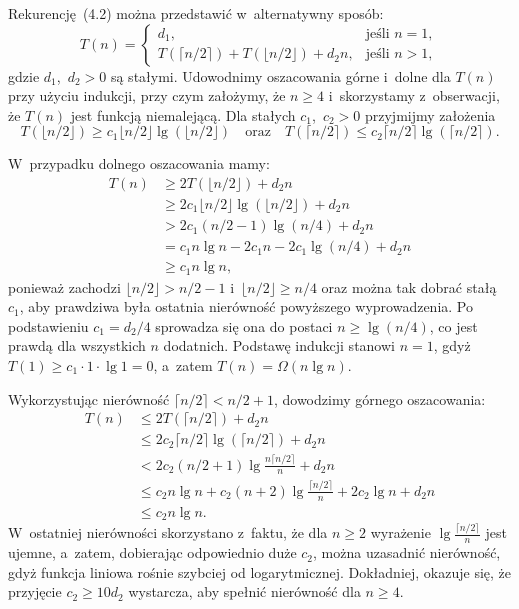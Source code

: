 \exercise %
Rekurencję~(4.2) można przedstawić w~alternatywny sposób:
\[
	T(n) =
	\begin{cases}
		d_1, & \text{jeśli $n=1$}, \\
		T(\lceil n/2\rceil)+T(\lfloor n/2\rfloor)+d_2n, & \text{jeśli $n>1$},
	\end{cases}
\]
gdzie $d_1$,~$d_2>0$ są stałymi. Udowodnimy oszacowania górne i~dolne dla $T(n)$ przy użyciu indukcji, przy czym założymy, że $n\ge4$ i~skorzystamy z~obserwacji, że $T(n)$ jest funkcją niemalejącą. Dla stałych $c_1$,~$c_2>0$ przyjmijmy założenia
\[
	T(\lfloor n/2\rfloor) \ge c_1\lfloor n/2\rfloor\lg(\lfloor n/2\rfloor) \quad\text{oraz}\quad T(\lceil n/2\rceil) \le c_2\lceil n/2\rceil\lg(\lceil n/2\rceil).
\]

W~przypadku dolnego oszacowania mamy:
\begin{align*}
	T(n) &\ge 2T(\lfloor n/2\rfloor)+d_2n \\
	&\ge 2c_1\lfloor n/2\rfloor\lg(\lfloor n/2\rfloor)+d_2n \\
	&> 2c_1(n/2-1)\lg(n/4)+d_2n \\
	&= c_1n\lg n-2c_1n-2c_1\!\lg(n/4)+d_2n \\
	&\ge c_1n\lg n,
\end{align*}
ponieważ zachodzi $\lfloor n/2\rfloor>n/2-1$ i~$\lfloor n/2\rfloor\ge n/4$ oraz można tak dobrać stałą $c_1$, aby prawdziwa była ostatnia nierówność powyższego wyprowadzenia. Po podstawieniu $c_1=d_2/4$ sprowadza się ona do postaci $n\ge\lg(n/4)$, co jest prawdą dla wszystkich $n$ dodatnich. Podstawę indukcji stanowi $n=1$, gdyż $T(1)\ge c_1\cdot 1\cdot\lg1=0$, a~zatem $T(n)=\Omega(n\lg n)$.

Wykorzystując nierówność $\lceil n/2\rceil<n/2+1$, dowodzimy górnego oszacowania:
\begin{align*}
	T(n) &\le 2T(\lceil n/2\rceil)+d_2n \\
	&\le 2c_2\lceil n/2\rceil\lg(\lceil n/2\rceil)+d_2n \\
	&< 2c_2(n/2+1)\lg\frac{n\lceil n/2\rceil}{n}+d_2n \\
	&\le c_2n\lg n+c_2(n+2)\lg\frac{\lceil n/2\rceil}{n}+2c_2\lg n+d_2n \\
	&\le c_2n\lg n.
\end{align*}
W~ostatniej nierówności skorzystano z~faktu, że dla $n\ge2$ wyrażenie $\lg\frac{\lceil n/2\rceil}{n}$ jest ujemne, a~zatem, dobierając odpowiednio duże $c_2$, można uzasadnić nierówność, gdyż funkcja liniowa rośnie szybciej od logarytmicznej. Dokładniej, okazuje się, że przyjęcie $c_2\ge10d_2$ wystarcza, aby spełnić nierówność dla $n\ge4$.

